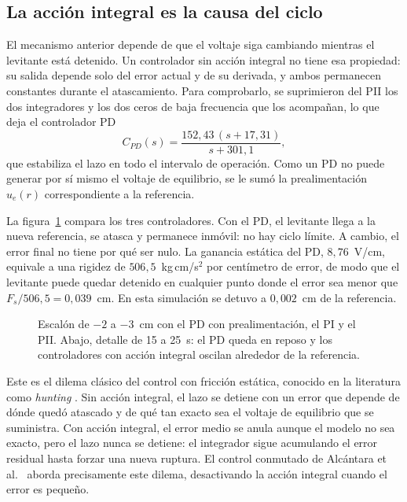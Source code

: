 \subsection{La acción integral es la causa del ciclo}

El mecanismo anterior depende de que el voltaje siga cambiando mientras el levitante está detenido. Un controlador sin acción integral no tiene esa propiedad: su salida depende solo del error actual y de su derivada, y ambos permanecen constantes durante el atascamiento. Para comprobarlo, se suprimieron del PII los dos integradores y los dos ceros de baja frecuencia que los acompañan, lo que deja el controlador PD
\[
C_{PD}(s) = \frac{152{,}43\,(s+17{,}31)}{s+301{,}1},
\]
que estabiliza el lazo en todo el intervalo de operación. Como un PD no puede generar por sí mismo el voltaje de equilibrio, se le sumó la prealimentación $u_e(r)$ correspondiente a la referencia.

La figura~\ref{fig:pd_pi_pii} compara los tres controladores. Con el PD, el levitante llega a la nueva referencia, se atasca y permanece inmóvil: no hay ciclo límite. A cambio, el error final no tiene por qué ser nulo. La ganancia estática del PD, $8{,}76$~V/cm, equivale a una rigidez de $506{,}5$~kg\,cm/s$^2$ por centímetro de error, de modo que el levitante puede quedar detenido en cualquier punto donde el error sea menor que $F_s/506{,}5 = 0{,}039$~cm. En esta simulación se detuvo a $0{,}002$~cm de la referencia.

\begin{figure}[ht]
    \centering
    
    \caption[PD, PI y PII con atascamiento-deslizamiento]{Escalón de $-2$ a $-3$~cm con el PD con prealimentación, el PI y el PII. Abajo, detalle de 15 a 25~s: el PD queda en reposo y los controladores con acción integral oscilan alrededor de la referencia.}
    \label{fig:pd_pi_pii}
\end{figure}

Este es el dilema clásico del control con fricción estática, conocido en la literatura como \emph{hunting} \cite{olsson}. Sin acción integral, el lazo se detiene con un error que depende de dónde quedó atascado y de qué tan exacto sea el voltaje de equilibrio que se suministra. Con acción integral, el error medio se anula aunque el modelo no sea exacto, pero el lazo nunca se detiene: el integrador sigue acumulando el error residual hasta forzar una nueva ruptura. El control conmutado de Alcántara et al.\ \cite{alcantara} aborda precisamente este dilema, desactivando la acción integral cuando el error es pequeño.

